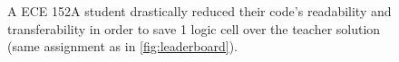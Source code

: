 
\begin{figure}[t]
    \centering
    \inputminted[frame=single]{systemverilog}{media/code/unreadable_opt.svh}
    \caption[
        Code optimized at expense of readability
    ]{
        A ECE 152A student drastically reduced their code's readability and transferability in order to save 1 logic cell over the teacher solution (same assignment as in \autoref{fig:leaderboard}).
    }
    \label{fig:unreadable_opt}
\end{figure}
